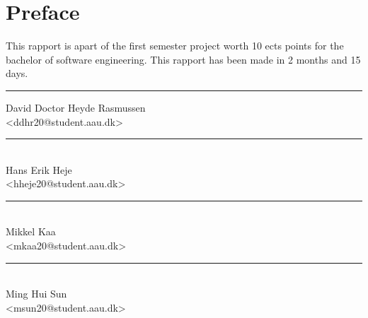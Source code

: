 \section*{Preface}%

This rapport is apart of the first semester project worth 10 ects points for the bachelor of software engineering. This rapport has been made in 2 months and 15 days.

\vfill\noindent

\begin{center}
  \begin{minipage}[b]{0.45\textwidth}
    \centering
    \rule{\textwidth}{0.5pt}
     David Doctor Heyde Rasmussen\\
    {\footnotesize <ddhr20@student.aau.dk>}
   \end{minipage}
\hfill
\begin{minipage}[b]{0.45\textwidth}
  \centering
  \rule{\textwidth}{0.5pt}\\
   Hans Erik Heje\\
  {\footnotesize <hheje20@student.aau.dk>}
 \end{minipage}
\vspace{3\baselineskip}
\end{center}

\begin{center}
\begin{minipage}[b]{0.45\textwidth}
 \centering
 \rule{\textwidth}{0.5pt}\\
  Mikkel Kaa\\
 {\footnotesize <mkaa20@student.aau.dk>}
\end{minipage}
\hfill
\begin{minipage}[b]{0.45\textwidth}
 \centering
 \rule{\textwidth}{0.5pt}\\
  Ming Hui Sun\\
 {\footnotesize <msun20@student.aau.dk>}
\end{minipage}
\end{center}